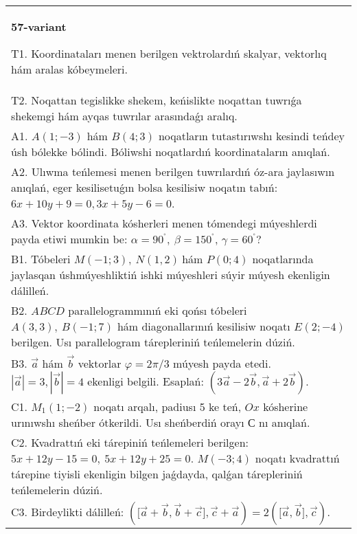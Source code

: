 \documentclass{article}
\begin{document}
    
    \begin{tabular}{m{17cm}}
    \textbf{57-variant}
    \newline
    
    T1. 
    Koordinataları menen berilgen vektrolardıń skalyar, vektorlıq hám aralas kóbeymeleri. \\
    T2. 
    Noqattan tegislikke shekem, keńislikte noqattan tuwrıǵa shekemgi hám ayqas tuwrılar arasındaǵı aralıq. \\
    A1. 
    $A(1;-3)$ hám $B(4;3)$ noqatların tutastırıwshı
    kesindi teńdey úsh bólekke bólindi. Bóliwshi noqatlardıń koordinataların
    anıqlań.
     \\
    A2. 
    Ulıwma teńlemesi menen berilgen tuwrılardıń      
    óz-ara jaylasıwın anıqlań, eger kesilisetuǵın bolsa kesilisiw noqatın 
    tabıń: $6x+10y+9=0, 3x+5y-6=0$.
     \\
    A3. 
    Vektor koordinata kósherleri menen tómendegi múyeshlerdi payda etiwi
    mumkin be: $\alpha = 90^{{^\circ}},\ \beta = 150^{{^\circ}}$,
    $\gamma = 60^{{^\circ}}?$ 
     \\
    B1. 
    Tóbeleri \(M(-1;3),\ N(1,2)\ \)hám \(P(0;4)\)
    noqatlarında jaylasqan úshmúyeshliktiń ishki múyeshleri súyir múyesh
    ekenligin dálilleń.
     \\
    B2. 
    $ABCD$ parallelogrammınıń eki qońsı tóbeleri
    \(A(3,3),\ B(-1;7)\) hám diagonallarınıń kesilisiw noqatı
    \(E(2;-4)\) berilgen. Usı parallelogram tárepleriniń teńlemelerin
    dúziń.
     \\
    B3. 
    $\vec{a}$ hám $\vec{b}$ vektorlar $\varphi = 2\pi/3$ múyesh payda etedi. $|\vec{a}| = 3,|\vec{b}| = 4$ ekenligi belgili. Esaplań: 
    $\left(3\vec{a} - 2\vec{b},\vec{a} + 2\vec{b} \right)$.
     \\
    C1. 
    \(M_{1}(1; - 2)\) noqatı arqalı, padiusı 5 ke teń,
    $Ox$ kósherine urınıwshı sheńber ótkerildi. Usı sheńberdiń orayı
    $С$ nı anıqlań.
     \\
    C2. 
    Kvadrattıń eki tárepiniń teńlemeleri berilgen:
    \(5x + 12y - 15 = 0,\ 5x + 12y + 25 = 0.\) \(M( - 3;4)\) noqatı
    kvadrattıń tárepine tiyisli ekenligin bilgen jaǵdayda, qalǵan
    tárepleriniń teńlemelerin dúziń.
     \\
    C3. 
    Birdeylikti dálilleń: \((\lbrack\vec{a} + \vec{b},\vec{b} + \vec{c}\rbrack,\vec{c} + \vec{a}) = 2 (\lbrack\vec{a},\vec{b}\rbrack,\vec{c}) \).
     \\
    
    \end{tabular}
    \vspace{1cm}
    
\end{document}
